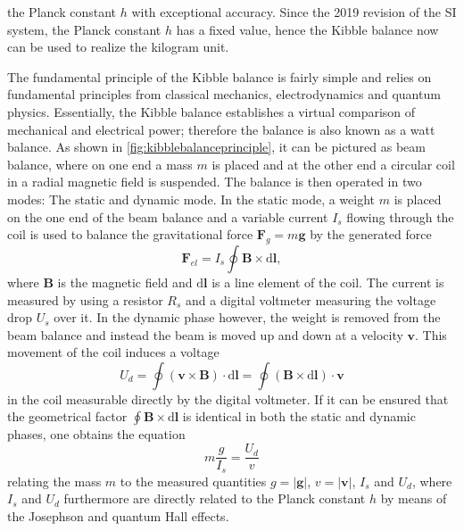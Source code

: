 \documentclass{article}
\newcommand\vect[1]{\ensuremath{\bm{#1}}}
\begin{document}
the Planck constant $h$ with exceptional accuracy. Since the 2019 revision of the SI system, the Planck constant $h$ has a fixed value, hence the Kibble balance now can be used to realize the kilogram unit.

The fundamental principle of the Kibble balance is fairly simple and relies on fundamental principles from classical mechanics, electrodynamics and quantum physics. Essentially, the Kibble balance establishes a virtual comparison of mechanical and electrical power; therefore the balance is also known as a watt balance. As shown in \cref{fig:kibblebalanceprinciple}, it can be pictured as beam balance, where on one end a mass $m$ is placed and at the other end a circular coil in a radial magnetic field is suspended. The balance is then operated in two modes: The static and dynamic mode. In the static mode, a weight $m$ is placed on the one end of the beam balance and a variable current $I_s$ flowing through the coil is used to balance the gravitational force $\vect{F}_g = m \vect{g}$ by the generated force \begin{equation}\vect{F}_{el} = I_s\oint \vect{B} \times  \mathrm{d}\vect{l},\end{equation} where $\vect{B}$ is the magnetic field and $\mathrm{d}\vect{l}$ is a line element of the coil. The current is measured by using a resistor $R_s$ and a digital voltmeter measuring the voltage drop $U_s$ over it. In the dynamic phase however, the weight is removed from the beam balance and instead the beam is moved up and down at a velocity $\vect{v}$. This movement of the coil induces a voltage \begin{equation}U_d = \oint (\vect{v}\times \vect{B})\cdot \mathrm{d}\vect{l} = \oint (\vect{B}\times \mathrm{d}\vect{l})\cdot \vect{v}\end{equation} in the coil measurable directly by the digital voltmeter. If it can be ensured that the geometrical factor $\oint \vect{B} \times  \mathrm{d}\vect{l}$ is identical in both the static and dynamic phases, one obtains the equation \begin{equation}\label{eq:kibblebalancefundamental}
	m\frac{g}{I_s} = \frac{U_d}{v}
\end{equation} relating the mass $m$ to the measured quantities $g=|\vect{g}|$, $v = |\vect{v}|$, $I_s$ and $U_d$, where $I_s$ and $U_d$ furthermore are directly related to the Planck constant $h$ by means of the Josephson and quantum Hall effects.
\end{document}
